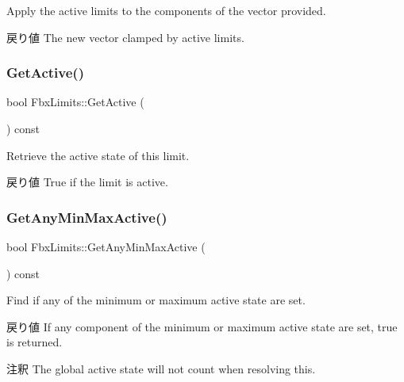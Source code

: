 Apply the active limits to the components of the vector provided. \begin{DoxyReturn}{戻り値}
The new vector clamped by active limits. 
\end{DoxyReturn}
\mbox{\label{class_fbx_limits_a2225bf4117f0c8c7cd99f74390ad26e3}} 
\subsubsection{\texorpdfstring{Get\+Active()}{GetActive()}}
{\footnotesize\ttfamily bool Fbx\+Limits\+::\+Get\+Active (\begin{DoxyParamCaption}{ }\end{DoxyParamCaption}) const}

Retrieve the active state of this limit. \begin{DoxyReturn}{戻り値}
True if the limit is active. 
\end{DoxyReturn}
\mbox{\label{class_fbx_limits_a8212a912af1692135239e402a38cd47c}} 
\subsubsection{\texorpdfstring{Get\+Any\+Min\+Max\+Active()}{GetAnyMinMaxActive()}}
{\footnotesize\ttfamily bool Fbx\+Limits\+::\+Get\+Any\+Min\+Max\+Active (\begin{DoxyParamCaption}{ }\end{DoxyParamCaption}) const}

Find if any of the minimum or maximum active state are set. \begin{DoxyReturn}{戻り値}
If any component of the minimum or maximum active state are set, true is returned. 
\end{DoxyReturn}
\begin{DoxyRemark}{注釈}
The global active state will not count when resolving this. 
\end{DoxyRemark}
\mbox{\label{class_fbx_limits_a398d831c3b798b29ccf33e29a72d6962}} 
